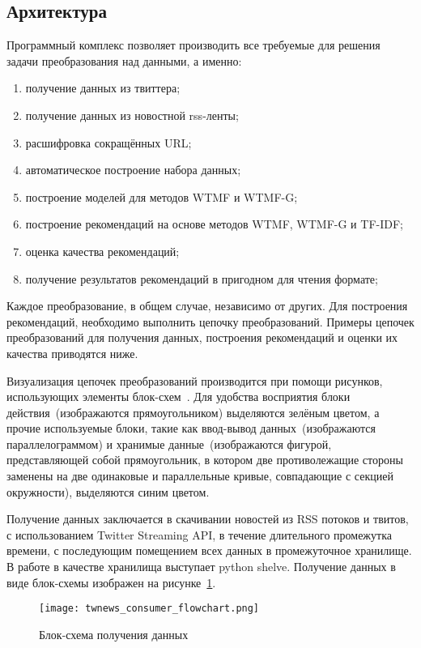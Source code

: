 \subsection{Архитектура}
    Программный комплекс позволяет производить все требуемые для решения задачи преобразования над данными, а именно:
    \begin{enumerate}
        \item получение данных из твиттера;
        \item получение данных из новостной rss-ленты;
        \item расшифровка сокращённых URL;
        \item автоматическое построение набора данных;
        \item построение моделей для методов WTMF и WTMF-G;
        \item построение рекомендаций на основе методов WTMF, WTMF-G и TF-IDF;
        \item оценка качества рекомендаций;
        \item получение результатов рекомендаций в пригодном для чтения формате;
    \end{enumerate}

    Каждое преобразование, в общем случае, независимо от других.
    Для построения рекомендаций, необходимо выполнить цепочку преобразований.
    Примеры цепочек преобразований для получения данных, построения рекомендаций и оценки их качества приводятся ниже.
    
    Визуализация цепочек преобразований производится при помощи рисунков, использующих элементы блок-схем~\cite{flowchart_gost}.
    Для удобства восприятия блоки действия~(изображаются прямоугольником) выделяются зелёным цветом, 
    а прочие используемые блоки, такие как ввод-вывод данных~(изображаются параллелограммом) и хранимые 
    данные~(изображаются фигурой, представляющей собой прямоугольник, в котором две противолежащие стороны 
    заменены на две одинаковые и параллельные кривые, совпадающие с секцией окружности), выделяются синим цветом.
    
    Получение данных заключается в скачивании новостей из RSS потоков и твитов, с использованием Twitter Streaming API, в течение длительного промежутка времени, с последующим помещением всех данных в промежуточное хранилище. В работе в качестве хранилища выступает python shelve.
    Получение данных в виде блок-схемы изображен на рисунке~\ref{pic:consumer_flowchart}.
    \begin{figure}[h!]
            \center
            \texttt{[image: twnews\_consumer\_flowchart.png]}
            \caption{Блок-схема получения данных}
            \label{pic:consumer_flowchart}
    \end{figure}

